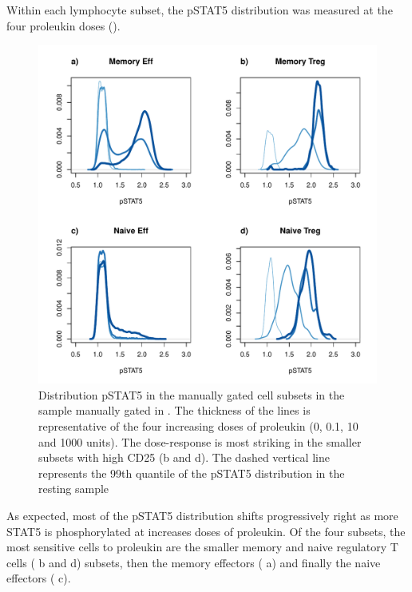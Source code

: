 Within each lymphocyte subset, the pSTAT5 distribution was measured at the four proleukin doses ().  

\hspace{-2cm}
\begin{figure}[h]
\centering
\includegraphics[scale=.45]{figures/dose-effect-pstat5-cellsubsets-density.pdf}
{ Distribution pSTAT5 in the manually gated cell subsets in the sample manually gated in . }
{
The thickness of the lines is representative of the four increasing doses of proleukin (0, 0.1, 10 and 1000 units).
The dose-response is most striking in the smaller subsets with high CD25 (b and d).
The dashed vertical line represents the 99th quantile of the pSTAT5 distribution in the resting sample
}
\end{figure}

As expected, most of the pSTAT5 distribution shifts progressively right as more STAT5 is phosphorylated at increases doses of proleukin.
Of the four subsets, the most sensitive cells to proleukin are the smaller memory and naive regulatory T cells ( b and d)
subsets, then the memory effectors ( a) and finally the naive effectors ( c).

